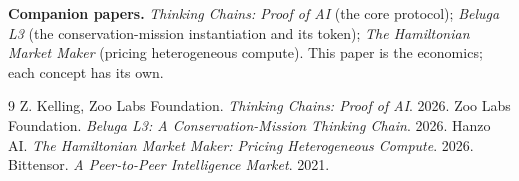 \documentclass[11pt]{article}
\begin{document}
\bigskip
\noindent\textbf{Companion papers.} \emph{Thinking Chains: Proof of AI} (the core protocol); \emph{Beluga L3} (the conservation-mission instantiation and its token); \emph{The Hamiltonian Market Maker} (pricing heterogeneous compute). This paper is the economics; each concept has its own.

\begin{thebibliography}{9}
 Z. Kelling, Zoo Labs Foundation. \emph{Thinking Chains: Proof of AI}. 2026.
 Zoo Labs Foundation. \emph{Beluga L3: A Conservation-Mission Thinking Chain}. 2026.
 Hanzo AI. \emph{The Hamiltonian Market Maker: Pricing Heterogeneous Compute}. 2026.
 Bittensor. \emph{A Peer-to-Peer Intelligence Market}. 2021.
\end{thebibliography}
\end{document}
